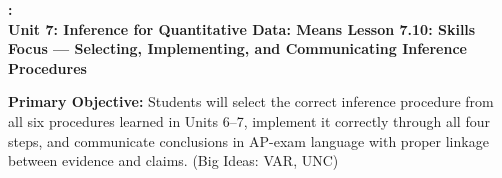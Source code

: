 \documentclass[10pt]{article}
\newcommand{\UnitNumberName}{Unit 7: Inference for Quantitative Data: Means \quad}
\newcommand{\LessonNumberName}{Lesson 7.10: Skills Focus --- Selecting, Implementing, and Communicating Inference Procedures}
\begin{document}
\begin{center}
    {\Large\bfseries \CourseName: \SchoolYear \\
    {\small\bfseries \UnitNumberName \LessonNumberName}}
\end{center}

\begin{tcolorbox}[colback=sky, colframe=navy, boxrule=0.9pt, arc=2mm,
    left=2mm, right=2mm, top=1.5mm, bottom=1.5mm]
    \textbf{Primary Objective:} Students will select the correct inference procedure from all
    six procedures learned in Units 6--7, implement it correctly through all four steps, and
    communicate conclusions in AP-exam language with proper linkage between evidence and claims.
    (Big Ideas: VAR, UNC)
\end{tcolorbox}

\renewcommand{\arraystretch}{1.6}
\end{document}
